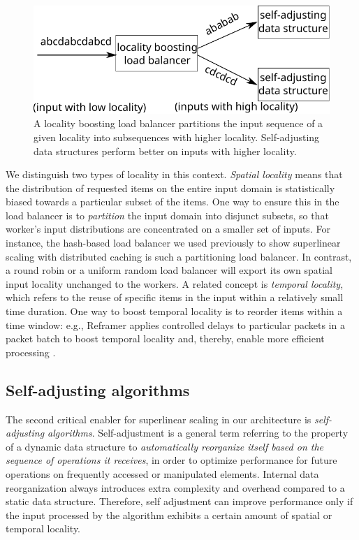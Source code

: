 \begin{figure}
  \centering
  \includegraphics[width=.85\linewidth]{fig/schema.pdf}
  \caption{A locality boosting load balancer partitions the input sequence of a given locality into subsequences with higher locality. Self-adjusting data structures perform better on inputs with higher locality.}
  \label{fig:locality-boosting-lb}
\end{figure}

We distinguish two types of locality in this context. \emph{Spatial locality} means that the distribution of requested items on the entire input domain is statistically biased towards a particular subset of the items. One way to ensure this in the load balancer is to \emph{partition} the input domain into disjunct subsets, so that worker's input distributions are concentrated on a smaller set of inputs. For instance, the hash-based load balancer we used previously to show superlinear scaling with distributed caching is such a partitioning load balancer. In contrast, a round robin or a uniform random load balancer will export its own spatial input locality unchanged to the workers. A related concept is \emph{temporal locality}, which refers to the reuse of specific items in the input within a relatively small time duration. One way to boost temporal locality is to reorder items within a time window: e.g., Reframer applies controlled delays to particular packets in a packet batch to boost temporal locality and, thereby, enable more efficient processing \cite{276946,246322}.

\subsection{Self-adjusting algorithms}
\label{sec:sa-alg}

The second critical enabler for superlinear scaling in our architecture is \emph{self-adjusting algorithms}. Self-adjustment is a general term referring to the property of a dynamic data structure to \emph{automatically reorganize itself based on the sequence of operations it receives}, in order to optimize performance for future operations on frequently accessed or manipulated elements. Internal data reorganization always introduces extra complexity and overhead compared to a static data structure. Therefore, self adjustment can improve performance only if the input processed by the algorithm exhibits a certain amount of spatial or temporal locality.

